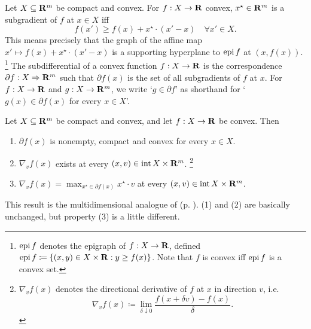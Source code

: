\documentclass[11pt,letterpaper,reqno,oneside]{article}
\begin{document}
Let $X \subseteq \mathbf{R}^m$ be compact and convex. For $f : X \to \mathbf{R}$ convex, $x^\star \in \mathbf{R}^m$ is a subgradient of $f$ at $x \in X$ iff
%
\begin{equation*}
	f(x') \geq f(x) + x^\star \cdot (x'-x)
	\quad\forall x' \in X .
\end{equation*}
%
This means precisely that the graph of the affine map $x' \mapsto f(x) + x^\star \cdot (x'-x)$ is a supporting hyperplane to $\operatorname*{epi} f$ at $(x,f(x))$.%
	\footnote{$\operatorname*{epi} f$ denotes the epigraph of $f : X \to \mathbf{R}$, defined $\operatorname*{epi} f \coloneqq \{ (x,y) \in X \times \mathbf{R} : y \geq f(x) \}$. Note that $f$ is convex iff $\operatorname*{epi} f$ is a convex set.}
The subdifferential of a convex function $f : X \to \mathbf{R}$ is the correspondence $\partial f : X \Rightarrow \mathbf{R}^m$ such that $\partial f(x)$ is the set of all subgradients of $f$ at $x$. For $f : X \to \mathbf{R}$ and $g : X \to \mathbf{R}^m$, we write `$g \in \partial f$' as shorthand for `$g(x) \in \partial f(x)$ for every $x \in X$'.
%
\begin{proposition}
	Let $X \subseteq \mathbf{R}^m$ be compact and convex, and let $f : X \to \mathbf{R}$ be convex. Then
	\begin{enumerate}

		\item $\partial f(x)$ is nonempty, compact and convex for every $x \in X$.

		\item $\nabla_v f(x)$ exists at every $(x,v) \in \operatorname*{int} X \times \mathbf{R}^m$.%
			\footnote{$\nabla_v f(x)$ denotes the directional derivative of $f$ at $x$ in direction $v$, i.e.
			\begin{equation*}
				\nabla_v f(x) \coloneqq 
				\lim_{\delta \downarrow 0} 
				\frac{ f( x + \delta v ) - f(x) }{ \delta } .
			\end{equation*}%
			}

		\item $\nabla_v f(x) = \max_{ x^\star \in \partial f(x) } x^\star \cdot v$ at every $(x,v) \in \operatorname*{int} X \times \mathbf{R}^m$.

	\end{enumerate}
\end{proposition}
%
\noindent This result is the multidimensional analogue of  (p. \pageref{proposition:convex_subgrad_1d}). (1) and (2) are basically unchanged, but property (3) is a little different.
\end{document}
